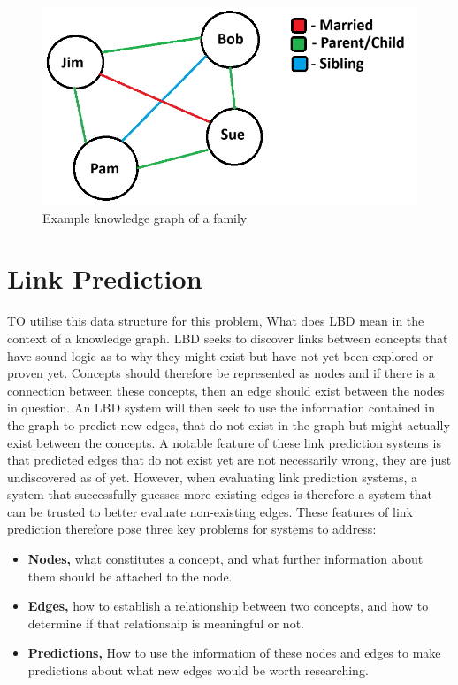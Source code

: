 \documentclass{l4proj}
\begin{document}
\begin{figure}[h]
    \centering
    \includegraphics[width=0.6\linewidth]{images/knowledge_graph.png}
    \caption{Example knowledge graph of a family}
    \label{fig:knowledge_graph}
\end{figure}

\section{Link Prediction}

TO utilise this data structure for this problem, What does LBD mean in the context of a knowledge graph. LBD seeks to discover links between concepts that have sound logic as to why they might exist but have not yet been explored or proven yet. Concepts should therefore be represented as nodes and if there is a connection between these concepts, then an edge should exist between the nodes in question. An LBD system will then seek to use the information contained in the graph to predict new edges, that do not exist in the graph but might actually exist between the concepts. A notable feature of these link prediction systems is that predicted edges that do not exist yet are not necessarily wrong, they are just undiscovered as of yet. However, when evaluating link prediction systems, a system that successfully guesses more existing edges is therefore a system that can be trusted to better evaluate non-existing edges. These features of link prediction therefore pose three key problems for systems to address: \\

\begin{itemize}
    \item \textbf{Nodes,} what constitutes a concept, and what further information about them should be attached to the node.
    \item \textbf{Edges,} how to establish a relationship between two concepts, and how to determine if that relationship is meaningful or not.
    \item \textbf{Predictions,} How to use the information of these nodes and edges to make predictions about what new edges would be worth researching. \\
\end{itemize}
\end{document}
